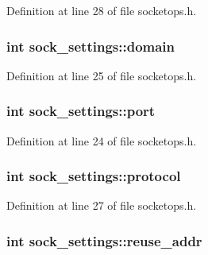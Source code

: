 Definition at line 28 of file socketops.\-h.

\hypertarget{structsock__settings_a95727084b18e3c1923a219e15260d79b}{
\subsubsection[{domain}]{\setlength{\rightskip}{0pt plus 5cm}int sock\-\_\-settings\-::domain}}\label{structsock__settings_a95727084b18e3c1923a219e15260d79b}


Definition at line 25 of file socketops.\-h.

\hypertarget{structsock__settings_aef86a0ad1b9e93d1a5b5c0c27f9336f8}{
\subsubsection[{port}]{\setlength{\rightskip}{0pt plus 5cm}int sock\-\_\-settings\-::port}}\label{structsock__settings_aef86a0ad1b9e93d1a5b5c0c27f9336f8}


Definition at line 24 of file socketops.\-h.

\hypertarget{structsock__settings_a938f8fc4b2ec0de16c809d4cc1d301da}{
\subsubsection[{protocol}]{\setlength{\rightskip}{0pt plus 5cm}int sock\-\_\-settings\-::protocol}}\label{structsock__settings_a938f8fc4b2ec0de16c809d4cc1d301da}


Definition at line 27 of file socketops.\-h.

\hypertarget{structsock__settings_a912e4c6ee79af4d8d259b7c85239a7f7}{
\subsubsection[{reuse\-\_\-addr}]{\setlength{\rightskip}{0pt plus 5cm}int sock\-\_\-settings\-::reuse\-\_\-addr}}\label{structsock__settings_a912e4c6ee79af4d8d259b7c85239a7f7}


